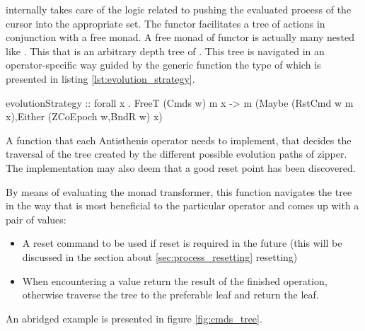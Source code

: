  internally takes care of the logic related to pushing the
evaluated process of the cursor into the appropriate set. The
 functor facilitates a tree of actions in conjunction with
a free monad.  A free monad of functor  is actually many
 nested like . This that
 is an arbitrary depth tree of . This
tree is navigated in an operator-specific way guided by the generic
function  the type of which is presented in
listing \ref{lst:evolution_strategy}.

\begin{code}
\begin{haskellcode}
evolutionStrategy
  :: forall x .
  FreeT (Cmds w) m x
  -> m (Maybe (RstCmd w m x),Either (ZCoEpoch w,BndR w) x)
\end{haskellcode}
  \caption{\label{lst:evolution_strategy}A function that each
    Antisthenis operator needs to implement, that decides the traversal of
    the tree created by the different possible evolution paths of
    zipper. The implementation may also deem that a good reset point
    has been discovered.}
\end{code}

By means of evaluating the  monad transformer,
this function navigates the tree in the way that is most beneficial to
the particular operator and comes up with a pair of values:

\begin{itemize}
\item A reset command to be used if reset is required in the future
  (this will be discussed in the section about
  \ref{sec:process_resetting} resetting)
\item When encountering a  value return the result
  of the finished operation, otherwise traverse the tree to the
  preferable leaf and return the leaf.
\end{itemize}

An abridged example is presented in figure \ref{fig:cmds_tree}.

